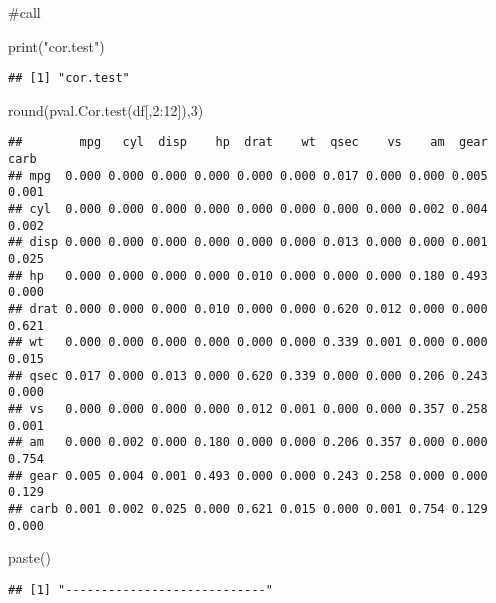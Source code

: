 \documentclass[
]{article}
\newenvironment{Shaded}{\begin{snugshade}}{\end{snugshade}}
\newcommand{\DecValTok}[1]{\textcolor[rgb]{0.00,0.00,0.81}{#1}}
\newcommand{\FunctionTok}[1]{\textcolor[rgb]{0.00,0.00,0.00}{#1}}
\newcommand{\NormalTok}[1]{#1}
\newcommand{\SpecialCharTok}[1]{\textcolor[rgb]{0.00,0.00,0.00}{#1}}
\newcommand{\StringTok}[1]{\textcolor[rgb]{0.31,0.60,0.02}{#1}}
\begin{document}
\#call

\begin{Shaded}
\begin{Highlighting}[]
\FunctionTok{print}\NormalTok{(}\StringTok{"cor.test"}\NormalTok{)}
\end{Highlighting}
\end{Shaded}

\begin{verbatim}
## [1] "cor.test"
\end{verbatim}

\begin{Shaded}
\begin{Highlighting}[]
\FunctionTok{round}\NormalTok{(}\FunctionTok{pval.Cor.test}\NormalTok{(df[,}\DecValTok{2}\SpecialCharTok{:}\DecValTok{12}\NormalTok{]),}\DecValTok{3}\NormalTok{)}
\end{Highlighting}
\end{Shaded}

\begin{verbatim}
##        mpg   cyl  disp    hp  drat    wt  qsec    vs    am  gear  carb
## mpg  0.000 0.000 0.000 0.000 0.000 0.000 0.017 0.000 0.000 0.005 0.001
## cyl  0.000 0.000 0.000 0.000 0.000 0.000 0.000 0.000 0.002 0.004 0.002
## disp 0.000 0.000 0.000 0.000 0.000 0.000 0.013 0.000 0.000 0.001 0.025
## hp   0.000 0.000 0.000 0.000 0.010 0.000 0.000 0.000 0.180 0.493 0.000
## drat 0.000 0.000 0.000 0.010 0.000 0.000 0.620 0.012 0.000 0.000 0.621
## wt   0.000 0.000 0.000 0.000 0.000 0.000 0.339 0.001 0.000 0.000 0.015
## qsec 0.017 0.000 0.013 0.000 0.620 0.339 0.000 0.000 0.206 0.243 0.000
## vs   0.000 0.000 0.000 0.000 0.012 0.001 0.000 0.000 0.357 0.258 0.001
## am   0.000 0.002 0.000 0.180 0.000 0.000 0.206 0.357 0.000 0.000 0.754
## gear 0.005 0.004 0.001 0.493 0.000 0.000 0.243 0.258 0.000 0.000 0.129
## carb 0.001 0.002 0.025 0.000 0.621 0.015 0.000 0.001 0.754 0.129 0.000
\end{verbatim}

\begin{Shaded}
\begin{Highlighting}[]
\FunctionTok{paste}\NormalTok{(}\StringTok{\textquotesingle{}{-}{-}{-}{-}{-}{-}{-}{-}{-}{-}{-}{-}{-}{-}{-}{-}{-}{-}{-}{-}{-}{-}{-}{-}{-}{-}{-}{-}\textquotesingle{}}\NormalTok{)}
\end{Highlighting}
\end{Shaded}

\begin{verbatim}
## [1] "----------------------------"
\end{verbatim}
\end{document}
